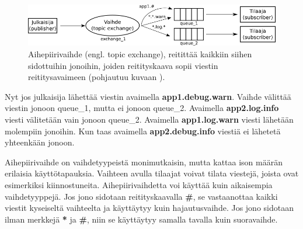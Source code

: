 \begin{figure}[ht!]
	\includegraphics[width=1\textwidth]{pictures/amqp-topic-exchange.png}
	\caption{Aihepiirivaihde (engl. topic exchange), reitittää kaikkiin siihen sidottuihin jonoihin, joiden reitityskaava sopii viestin reititysavaimeen (pohjautuu kuvaan \cite{RabbitMQ-Tutorial-Topics}).}
	\label{fig:amqp-topic-exchange}
\end{figure}

Nyt jos julkaisija lähettää viestin avaimella \textbf{app1.debug.warn}. Vaihde välittää viestin jonoon queue\_1, mutta ei jonoon queue\_2. Avaimella \textbf{app2.log.info} viesti välitetään vain jonoon queue\_2. Avaimella \textbf{app1.log.warn} viesti lähetään molempiin jonoihin. Kun taas avaimella \textbf{app2.debug.info} viestiä ei lähetetä yhteenkään jonoon.

Aihepiirivaihde on vaihdetyypeistä monimutkaisin, mutta kattaa ison määrän erilaisia käyttötapauksia. Vaihteen avulla tilaajat voivat tilata viestejä, joista ovat esimerkiksi kiinnostuneita. Aihepiirivaihdetta voi käyttää kuin aikaisempia vaihdetyyppejä. Jos jono sidotaan reitityskaavalla \textbf{\#}, se vastaanottaa kaikki viestit kyseiseltä vaihteelta ja käyttäytyy kuin hajautusvaihde. Jos jono sidotaan ilman merkkejä \textbf{*} ja \textbf{\#}, niin se käyttäytyy samalla tavalla kuin suoravaihde. \cite{RabbitMQ-Tutorial-Topics}


